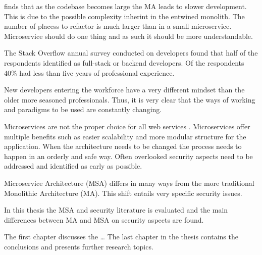 \begin{sloppypar}
    \citet{10.1007/978-3-319-74433-9_3} finds that as the codebase becomes large 
    the MA leads to slower development. This is due to the possible complexity
    inherint in the entwined monolith. The number of placess to refactor is much 
    larger than in a small microservice. Microservice should do one thing and as 
    such it should be more understandable.
\end{sloppypar} 
\begin{sloppypar}
    The Stack Overflow annual survey \citep{sosurvey2019} conducted on 
    developers found that half of the respondents identified as full-stack or 
    backend developers. Of the respondents 40\% had less than five years of 
    professional experience.
\end{sloppypar}
\begin{sloppypar}
    New developers entering the workforce have a very different mindset than 
    the older more seasoned professionals. Thus, it is very clear that the ways 
    of working and paradigms to be used are constantly changing.
\end{sloppypar}
\begin{sloppypar}
     Microservices are not the proper choice for all web services 
     \citep{newman2019}. Microservices offer multiple benefits such as easier 
     scalability and more modular structure for the application. When the 
     architecture needs to be changed the process needs to happen in an orderly 
     and safe way. Often overlooked security aspects need to be addressed and 
     identified as early as possible.
\end{sloppypar}
\begin{sloppypar}
    Microservice Architecture (MSA) differs in many ways from 
    the more traditional Monolithic Architecture (MA). This shift entails very 
    specific security issues.
\end{sloppypar}
\begin{sloppypar}
    In this thesis the MSA and security literature is evaluated and the main 
    differences between MA and MSA on security aspects are found.
\end{sloppypar}
\begin{sloppypar}
    The first chapter discusses the \dots
    The last chapter in the thesis contains the conclusions and presents further 
    research topics.
\end{sloppypar}



